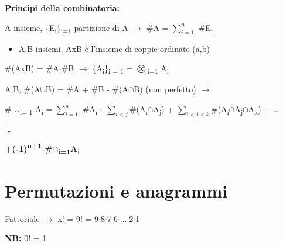 \documentclass[12pt, letterpaper]{article}
\def\SPSB#1#2{\rlap{\textsuperscript{#1}}\SB{#2}}
\def\SP#1{\textsuperscript{#1}}
\def\SB#1{\textsubscript{#1}}
\begin{document}
\textbf{Principi della combinatoria:}
\begin{enumerate}
    \item A insieme, \{E\textsubscript{i}\}\SPSB{n}{i=1} partizione di A $\rightarrow$ \#A = $\sum_{i = 1}^{n}$ \#E\textsubscript{i} 
    \begin{itemize}
        \item A,B insiemi, AxB è l'insieme di coppie ordinate (a,b)
    \end{itemize}  
    \item \#(AxB) = \#A$\cdot$\#B $\rightarrow$ \{A\textsubscript{i}\}\SPSB{n}{i = 1} = $\bigotimes$\SPSB{n}{i=1} A\SB{i}
    \item A,B, \#(A$\cup$B) = \underline{\#A + \#B - \#(A{$\cap$}B)} (non perfetto) $\rightarrow$
    \begin{center}
        \item \# $\cup$\SPSB{n}{i= 1} A\SB{i} = $\sum_{i = 1}^{n}$ \#A\SB{i} - $\sum_{i<j}^{}$\#(A\SB{i}$\cap$A\SB{j}) +
        $\sum_{i<j<k}^{}$\#(A\SB{i}$\cap$A\SB{j}$\cap$A\SB{k}) + \dots
        
        $\downarrow$

        \textbf{+(-1)\SP{n+1} \#$\cap$\SPSB{n}{i=1}A\SB{i}}
    \end{center}
\end{enumerate}

\section{Permutazioni e anagrammi}

Fattoriale $\rightarrow$ x! = 9! = 9$\cdot$8$\cdot$7$\cdot$6$\cdot$$\dots$$\cdot$2$\cdot$1

\textbf{NB:} 0! = 1
\end{document}
